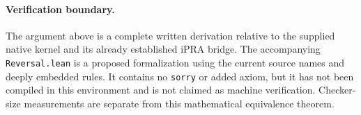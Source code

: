 \paragraph{Verification boundary.}
The argument above is a complete written derivation relative to the
supplied native kernel and its already established iPRA bridge. The
accompanying \texttt{Reversal.lean} is a proposed formalization using
the current source names and deeply embedded rules. It contains no
\texttt{sorry} or added axiom, but it has not been compiled in this
environment and is not claimed as machine verification. Checker-size
measurements are separate from this mathematical equivalence theorem.
